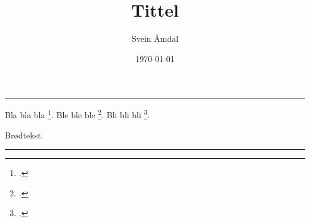 \documentclass[12pt, a4paper, norsk]{article}
\title{\huge{Tittel}}
\author{Svein Åmdal}
\date{\today}
\begin{document}
\maketitle
\hrule
\vspace{1cm}

Bla bla bla \footcite[20]{Ødegård}. Ble ble ble \footcite[27--30]{Ødegård}. Bli bli bli \footcite[4,22-23,45]{Wiesner-Hanks,Pounds}.


% 

Brødtekst.



\vspace{1cm}
\hrule
\printbibliography[title=Litteratur]
\end{document}

